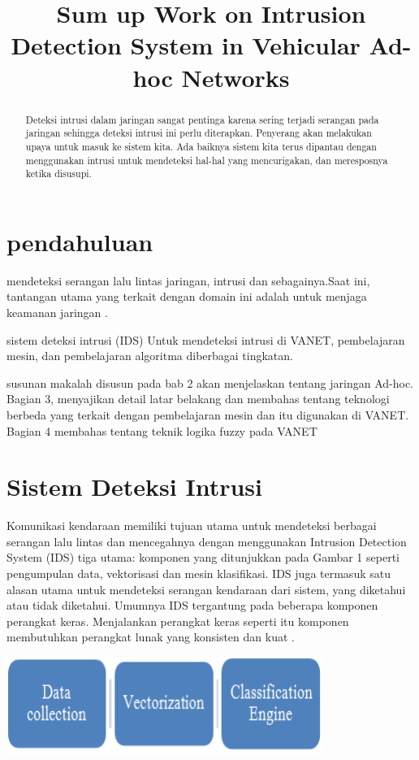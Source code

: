 \documentclass[conference]{IEEEtran}
\title{Sum up Work on Intrusion Detection System in Vehicular Ad-hoc Networks}
\author{\IEEEauthorblockN{Johanes Wilian Ang}
\IEEEauthorblockA{\textit{Fakultas Teknologi Informasi} \\
\textit{Institut Teknologi Batam}\\
Batam, Indonesia \\
email: johanwilian455@gmail.com,}
}
\begin{document}
\maketitle
\begin{abstract}
    Deteksi intrusi dalam jaringan sangat pentinga karena sering terjadi serangan pada jaringan sehingga deteksi intrusi ini perlu diterapkan. Penyerang akan melakukan upaya untuk masuk ke sistem kita. Ada baiknya sistem kita terus dipantau dengan menggunakan intrusi untuk mendeteksi hal-hal yang mencurigakan, dan meresposnya ketika disusupi.
\end{abstract}

\section{pendahuluan}
    mendeteksi serangan lalu lintas jaringan, intrusi dan sebagainya.Saat ini, tantangan utama yang terkait dengan domain ini adalah untuk menjaga keamanan jaringan \cite {aydin2009hybrid}.
    
    sistem deteksi intrusi (IDS) Untuk mendeteksi intrusi di VANET, pembelajaran mesin, dan pembelajaran algoritma diberbagai tingkatan.
    
    susunan makalah disusun pada bab 2 akan menjelaskan tentang jaringan Ad-hoc. Bagian 3, menyajikan detail latar belakang dan membahas tentang teknologi berbeda yang terkait dengan pembelajaran mesin dan itu digunakan di VANET. Bagian 4 membahas tentang teknik logika fuzzy pada VANET

\section{Sistem Deteksi Intrusi}
    Komunikasi kendaraan memiliki tujuan utama untuk mendeteksi berbagai serangan lalu lintas dan mencegahnya dengan menggunakan Intrusion Detection System (IDS) tiga utama: komponen yang ditunjukkan pada Gambar 1 seperti pengumpulan data, vektorisasi dan mesin klasifikasi. IDS juga termasuk satu alasan utama untuk mendeteksi serangan kendaraan dari sistem, yang diketahui atau tidak diketahui. Umumnya IDS tergantung pada beberapa komponen perangkat keras. Menjalankan perangkat keras seperti itu komponen membutuhkan perangkat lunak yang konsisten dan kuat \cite {zhang2010research}.

\begin{center}
\includegraphics[width=.4\textwidth]{gambar/tugas7-1.PNG}

\end{center}
\end{document}
